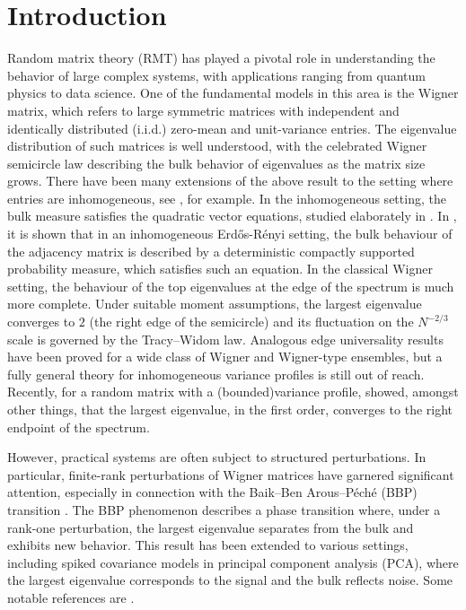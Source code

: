 \documentclass[11pt, reqno]{amsart}
\numberwithin{equation}{section}
\begin{document}
\section{Introduction}
Random matrix theory (RMT) has played a pivotal role in understanding the behavior of large complex systems, with applications ranging from quantum physics to data science. One of the fundamental models in this area is the Wigner matrix, which refers to large symmetric matrices with independent and identically distributed (i.i.d.) zero-mean and unit-variance entries. The eigenvalue distribution of such matrices is well understood, with the celebrated Wigner semicircle law describing the bulk behavior of eigenvalues as the matrix size grows. There have been many extensions of the above result to the setting where entries are inhomogeneous, see \cite{anderson2006clt, shlyakhtenko1996random, zhu2020graphon}, for example. In the inhomogeneous setting, the bulk measure satisfies the quadratic vector equations, studied elaborately in \cite{ajanki2017universality, ajanki2019quadratic}. In \cite{chakrabarty2021spectra, zhu2020graphon}, it is shown that in an inhomogeneous Erd\H{o}s-R\'enyi setting, the bulk behaviour of the adjacency matrix is described by a deterministic compactly supported probability measure, which satisfies such an equation. In the classical Wigner setting, the behaviour of the top eigenvalues at the edge of the spectrum is much more complete. Under suitable moment assumptions, the largest eigenvalue converges to $2$ (the right edge of the semicircle) and its fluctuation on the $N^{-2/3}$ scale is governed by the Tracy–Widom law. Analogous edge universality results have been proved for a wide class of Wigner and Wigner-type ensembles, but a fully general theory for inhomogeneous variance profiles is still out of reach. Recently, for a random matrix with a (bounded)variance profile, \cite{ducatez2024large} showed, amongst other things, that the largest eigenvalue, in the first order, converges to the right endpoint of the spectrum. 


However, practical systems are often subject to structured perturbations. In particular, finite-rank perturbations of Wigner matrices have garnered significant attention, especially in connection with the Baik–Ben Arous–P\'eché (BBP) transition \cite{baik2005phase, peche2006largest, feral2007largest}. The BBP phenomenon describes a phase transition where, under a rank-one perturbation, the largest eigenvalue separates from the bulk and exhibits new behavior. This result has been extended to various settings, including spiked covariance models in principal component analysis (PCA), where the largest eigenvalue corresponds to the signal and the bulk reflects noise. Some notable references are \cite{benaych2011eigenvalues,capitaine2009largest, baik2006eigenvalues,bassler2009eigenvalue, benaych2011fluctuations}. 
\end{document}

